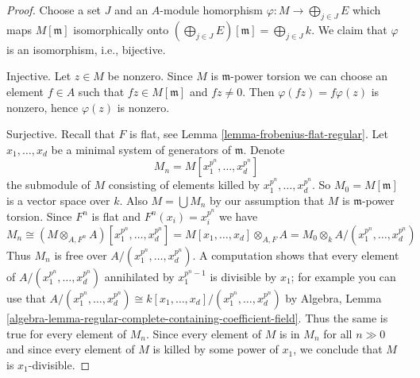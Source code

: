 \begin{proof}
Choose a set $J$ and an $A$-module homorphism
$\varphi : M \to \bigoplus_{j \in J} E$ which maps
$M[\mathfrak m]$ isomorphically onto
$(\bigoplus_{j \in J} E)[\mathfrak m] = \bigoplus_{j \in J} k$.
We claim that $\varphi$ is an isomorphism, i.e., bijective.

\medskip\noindent
Injective. Let $z \in M$ be nonzero. Since $M$ is $\mathfrak m$-power torsion
we can choose an element $f \in A$ such that $fz \in M[\mathfrak m]$ and
$fz \not = 0$. Then $\varphi(fz) = f\varphi(z)$ is nonzero, hence
$\varphi(z)$ is nonzero.

\medskip\noindent
Surjective. Recall that $F$ is flat, see
Lemma \ref{lemma-frobenius-flat-regular}.
Let $x_1, \ldots, x_d$ be a minimal system of generators of
$\mathfrak m$. Denote
$$
M_n = M[x_1^{p^n}, \ldots, x_d^{p^n}]
$$
the submodule of $M$ consisting of elements killed by
$x_1^{p^n}, \ldots, x_d^{p^n}$. So $M_0 = M[\mathfrak m]$
is a vector space over $k$. Also $M = \bigcup M_n$ by our
assumption that $M$ is $\mathfrak m$-power torsion. Since $F^n$ is flat and
$F^n(x_i) = x_i^{p^n}$ we have
$$
M_n \cong (M \otimes_{A, F^n} A)[x_1^{p^n}, \ldots, x_d^{p^n}] =
M[x_1, \ldots, x_d] \otimes_{A, F} A =
M_0 \otimes_k A/(x_1^{p^n}, \ldots, x_d^{p^n})
$$
Thus $M_n$ is free over $A/(x_1^{p^n}, \ldots, x_d^{p^n})$.
A computation shows that every element of $A/(x_1^{p^n}, \ldots, x_d^{p^n})$
annihilated by $x_1^{p^n - 1}$ is divisible by $x_1$; for example
you can use that $A/(x_1^{p^n}, \ldots, x_d^{p^n}) \cong
k[x_1, \ldots, x_d]/(x_1^{p^n}, \ldots, x_d^{p^n})$ by Algebra, Lemma
\ref{algebra-lemma-regular-complete-containing-coefficient-field}.
Thus the same is true for every element of $M_n$.
Since every element of $M$ is in $M_n$ for all $n \gg 0$
and since every element of $M$ is killed by some power of
$x_1$, we conclude that $M$ is $x_1$-divisible.


\end{proof}
